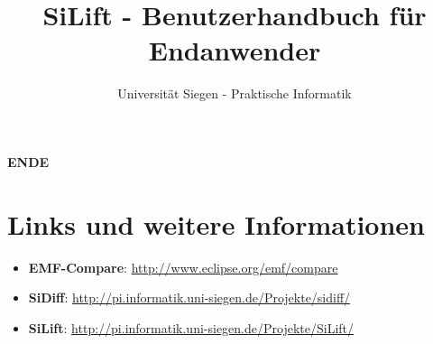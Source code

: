 \documentclass[a4paper]{scrartcl}
\begin{document}
\title{SiLift - Benutzerhandbuch für Endanwender}
\author{Universität Siegen - Praktische Informatik}


\maketitle



\newpage

\tableofcontents
\newpage












\begin{center}
\textbf{ENDE}
\end{center}

\newpage

\section{Links und weitere Informationen}

\begin{itemize}
\item \textbf{EMF-Compare}: \url{http://www.eclipse.org/emf/compare}
\item \textbf{SiDiff}: \url{http://pi.informatik.uni-siegen.de/Projekte/sidiff/}
\item \textbf{SiLift}: \url{http://pi.informatik.uni-siegen.de/Projekte/SiLift/}
\end{itemize} 

%
%
\end{document}

